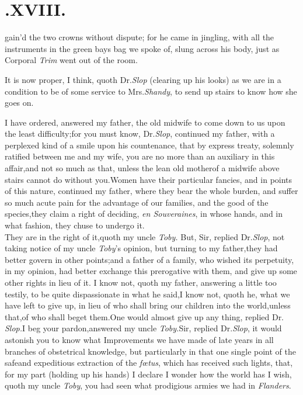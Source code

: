 \documentclass{article}
\begin{document}
\null
\section{.\enspace  XVIII.}

 gain’d the two crowns without
dispute; for he came in jingling, with all the instruments in
the green bays bag we spoke of, slung across his body, just as
Corporal \textit{Trim} went out of the room.

It is now proper, I think, quoth Dr.\@ \textit{Slop} (clearing up
his looks) as we are in a condition to be of some service to
Mrs.\@ \textit{Shandy}, to send up stairs to know\break 
how she goes on.

I have ordered, answered my father, 
the old midwife to come down to us\break
upon the least difficulty;\tsh for you\break
must know, Dr.\@ \textit{Slop}, continued my father, with a perplexed kind of a
smile upon his countenance, that by express treaty, solemnly
ratified between me and my wife, you are no more than an
auxi\-liary in this affair,\tsh and not so much as that,\tsh
unless the lean old mother\break of a midwife above stairs cannot do
without you.\tsh Women have their particular fancies, and in
points of this nature, continued my father, where they bear the
whole burden, and suffer so much acute pain for the advantage of
our families, and the good of the species,\tsk they claim a
right of deciding, \textit{en Souveraines}, in whose hands, and
in
what fashion, they chuse to undergo it.\\
\newpage
They are in the right of it,\tsh quoth\break
my uncle \textit{Toby.} But, Sir, replied Dr.\break \textit{Slop}, not taking notice of
my uncle \textit{Toby}’s opinion, but turning to my
father,\tsk they had better govern in other
points;\tsh and a father of a family, who wished its
perpetuity, in my opinion, had better exchange this prerogative
with them, and give up some other rights in lieu of
it.\tsh\break
I know not, quoth my father, answering a little too testily, to
be quite dispassionate in what he said,\tsk I know not, quoth
he, what we have left to give up, in lieu of who shall bring our
children into the world,\tsk unless that,\tsk of who shall beget
them.\tsh One would almost give up any thing, replied Dr.\@
\textit{Slop.}\tsk I beg your pardon,\tsh answered my uncle
\textit{Toby.}\break\tsk Sir, replied Dr.\@ \textit{Slop}, it
would astonish you to know what Improvements we have made of
late years in all branches
of obstetrical knowledge, but partic\-u\-larly in that
one single point of the safe\break and expeditious extraction of the
\textit{fœtus},\break
\tsh which has received such lights, that, 
for my part (holding up his hands) I 
declare I wonder how the world has\tsh\break
I wish, quoth my uncle \textit{Toby}, you had
seen what prodigious armies we had in \textit{Flanders}.
\end{document}
